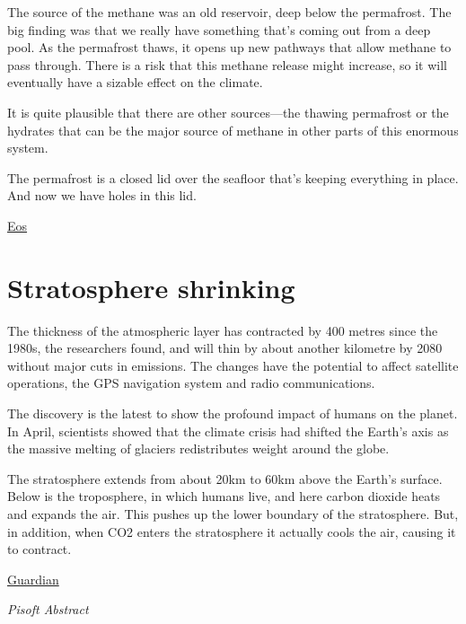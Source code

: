 \documentclass[
]{book}
\begin{document}
The source of the methane was an old reservoir, deep below the permafrost.
The big finding was that we really have something that's coming out from a deep pool.
As the permafrost thaws, it opens up new pathways that allow methane to pass through.
There is a risk that this methane release might increase, so it will eventually have a sizable effect on the climate.

It is quite plausible that there are other sources---the thawing permafrost or the hydrates that can be the major source of methane in other parts of this enormous system.

The permafrost is a closed lid over the seafloor that's keeping everything in place. And now we have holes in this lid.

\href{https://eos.org/articles/a-massive-methane-reservoir-is-lurking-beneath-the-sea\#.YJUr2-3rTRI.twitter}{Eos}

\hypertarget{stratosphere-shrinking}{%
\section{Stratosphere shrinking}\label{stratosphere-shrinking}}

The thickness of the atmospheric layer has contracted by 400 metres since the 1980s, the researchers found, and will thin by about another kilometre by 2080 without major cuts in emissions. The changes have the potential to affect satellite operations, the GPS navigation system and radio communications.

The discovery is the latest to show the profound impact of humans on the planet. In April, scientists showed that the climate crisis had shifted the Earth's axis as the massive melting of glaciers redistributes weight around the globe.

The stratosphere extends from about 20km to 60km above the Earth's surface. Below is the troposphere, in which humans live, and here carbon dioxide heats and expands the air. This pushes up the lower boundary of the stratosphere. But, in addition, when CO2 enters the stratosphere it actually cools the air, causing it to contract.

\href{https://www.theguardian.com/environment/2021/may/12/emissions-shrinking-the-stratosphere-scientists-find}{Guardian}

\emph{Pisoft Abstract}
\end{document}
